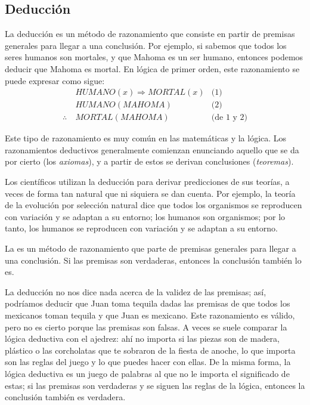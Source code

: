 \subsection*{Deducción}
\label{sub:deduccion}
La deducción es un método de razonamiento que consiste en partir de premisas generales para llegar a una conclusión.
Por ejemplo, si sabemos que todos los seres humanos son mortales, y que Mahoma es un ser humano, entonces podemos deducir que Mahoma es mortal.
En lógica de primer orden, este razonamiento se puede expresar como sigue:
\begin{align*}
	             & \mathit{HUMANO}(x) \Rightarrow \mathit{MORTAL}(x) & \text{(1)}        \\
	             & \mathit{HUMANO}(\mathit{MAHOMA})                  & \text{(2)}        \\
	\therefore\  & \mathit{MORTAL}(\mathit{MAHOMA})                  & \text{(de 1 y 2)}
\end{align*}

Este tipo de razonamiento es muy común en las matemáticas y la lógica.
Los razonamientos deductivos generalmente comienzan enunciando aquello que se da por cierto (los \emph{axiomas}), y a partir de estos se derivan conclusiones (\emph{teoremas}).

Los científicos utilizan la deducción para derivar predicciones de sus teorías, a veces de forma tan natural que ni siquiera se dan cuenta.
Por ejemplo, la teoría de la evolución por selección natural dice que todos los organismos se reproducen con variación y se adaptan a su entorno; los humanos son organismos; por lo tanto, los humanos se reproducen con variación y se adaptan a su entorno.

\begin{remember}
	\label{rem:deduccion}
	La  es un método de razonamiento que parte de
	premisas generales para llegar a una conclusión.
	Si las premisas son verdaderas, entonces la conclusión también lo es.
\end{remember}

La deducción no nos dice nada acerca de la validez de las premisas; así, podríamos deducir que Juan toma tequila dadas las premisas de que todos los mexicanos toman tequila y que Juan es mexicano.
Este razonamiento es válido, pero no es cierto porque las premisas son falsas.
A veces se suele comparar la lógica deductiva con el ajedrez: ahí no importa si las piezas son de madera, plástico o las corcholatas que te sobraron de la fiesta de anoche, lo que importa son las reglas del juego y lo que puedes hacer con ellas.
De la misma forma, la lógica deductiva es un juego de palabras al que no le importa el significado de estas; si las premisas son verdaderas y se siguen las reglas de la lógica, entonces la conclusión también es verdadera.

